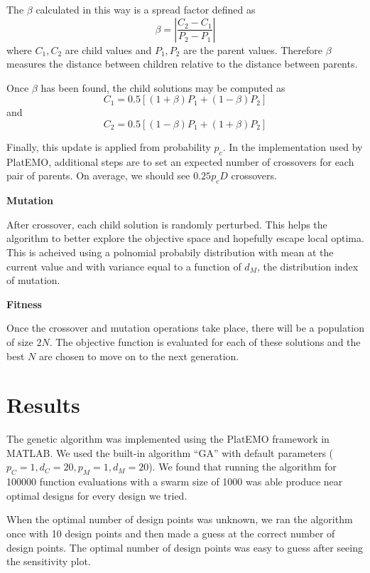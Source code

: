 \documentclass[11pt,a4paper]{article}
\begin{document}
The $\beta$ calculated in this way is a spread factor defined as 
$$
\beta = \left| \frac{C_2 - C_1}{P_2 - P_1} \right|
$$
where $C_1, C_2$ are child values and $P_1, P_2$ are the parent values. Therefore $\beta$ measures the distance between children relative to the distance between parents.

Once $\beta$ has been found, the child solutions may be computed as
$$
C_1 = 0.5\left[(1+\beta)P_1 + (1-\beta)P_2 \right]
$$
and 
$$
C_2 = 0.5\left[(1-\beta)P_1 + (1+\beta)P_2 \right]
$$

Finally, this update is applied from probability $p_c$. In the implementation used by PlatEMO, additional steps are to set an expected number of crossovers for each pair of parents. On average, we should see $0.25 p_cD$ crossovers.

\begin{flushleft}
\textbf{Mutation}
\end{flushleft}
After crossover, each child solution is randomly perturbed. This helps the algorithm to better explore the objective space and hopefully escape local optima. This is acheived using a polnomial probabily distribution with mean at the current value and with variance equal to a function of $d_M$, the distribution index of mutation.



\begin{flushleft}
\textbf{Fitness}
\end{flushleft}
Once the crossover and mutation operations take place, there will be a population of size $2N$. The objective function is evaluated for each of these solutions and the best $N$ are chosen to move on to the next generation.



\section{Results}
The genetic algorithm was implemented using the PlatEMO framework in MATLAB. We used the built-in algorithm ``GA'' with default parameters ($p_C = 1, d_C = 20, p_M = 1, d_M = 20$). We found that running the algorithm for 100000 function evaluations with a swarm size of 1000 was able produce near optimal designs for every design we tried. 

When the optimal number of design points was unknown, we ran the algorithm once with 10 design points and then made a guess at the correct number of design points. The optimal number of design points was easy to guess after seeing the sensitivity plot.
\end{document}
